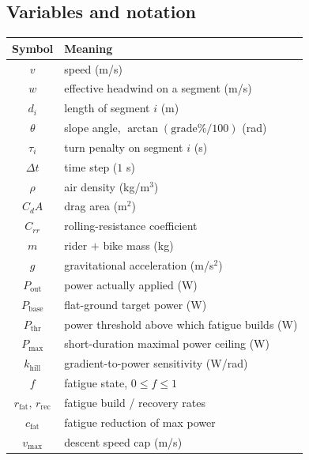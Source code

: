 \documentclass[11pt]{article}
\begin{document}
\subsection{Variables and notation}
\begin{center}
\begin{tabular}{cl}
\toprule
Symbol & Meaning \\
\midrule
$v$ & speed (m/s) \\
$w$ & effective headwind on a segment (m/s) \\
$d_i$ & length of segment $i$ (m) \\
$\theta$ & slope angle, $\arctan(\mathrm{grade}\%/100)$ (rad) \\
$\tau_i$ & turn penalty on segment $i$ (s) \\
$\Delta t$ & time step ($1$ s) \\
$\rho$ & air density (kg/m$^3$) \\
$C_dA$ & drag area (m$^2$) \\
$C_{rr}$ & rolling-resistance coefficient \\
$m$ & rider $+$ bike mass (kg) \\
$g$ & gravitational acceleration (m/s$^2$) \\
$P_\mathrm{out}$ & power actually applied (W) \\
$P_\mathrm{base}$ & flat-ground target power (W) \\
$P_\mathrm{thr}$ & power threshold above which fatigue builds (W) \\
$P_\mathrm{max}$ & short-duration maximal power ceiling (W) \\
$k_\mathrm{hill}$ & gradient-to-power sensitivity (W/rad) \\
$f$ & fatigue state, $0 \le f \le 1$ \\
$r_\mathrm{fat},\, r_\mathrm{rec}$ & fatigue build / recovery rates \\
$c_\mathrm{fat}$ & fatigue reduction of max power \\
$v_\mathrm{max}$ & descent speed cap (m/s) \\
\bottomrule
\end{tabular}
\end{center}
\end{document}
